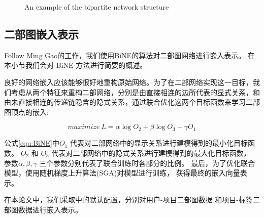 \documentclass[lang=cn,11pt]{elegantpaper}
\begin{document}
\begin{figure}[htbp]
	\centering
	\quad

	\caption{ An example of the bipartite network structure\label{fig:matrix}} 
\end{figure}

\subsection{二部图嵌入表示}

Follow Ming Gao的工作\cite{Gao2018}，我们使用BiNE的算法对二部图网络进行嵌入表示。
在本小节我们会对 BiNE 方法进行简要的概述。

良好的网络嵌入应该能够很好地重构原始网络。为了在二部网络实现这一目标，我们考虑从两个特征来重构二部网络，分别是由直接相连的边所代表的显式关系，和由未直接相连的传递链隐含的隐式关系，通过联合优化这两个目标函数来学习二部图顶点的嵌入:

\begin{equation} \label{equ:BiNE}
    maximize\ L=\alpha \log O_{2}+\beta \log O_{3}-\gamma O_{1}
\end{equation}

公式\ref{equ:BiNE}中$ O_{1}$ 代表对二部网络中的显示关系进行建模得到的最小化目标函数。
$ O_{2}$ 和 $ O_{3}$ 代表对二部网络中的隐式关系进行建模得到的最大化目标函数，
参数$ \alpha,\beta,\gamma$ 三个参数分别代表了联合训练时各部分的比例。
最后，为了优化联合模型，使用随机梯度上升算法(SGA)对模型进行训练，
获得最终的嵌入向量表示。

在本论文中，我们采取\cite{Gao2018}中的默认配置，分别对用户-项目二部图数据
和项目-标签二部图数据进行嵌入表示。
\end{document}
